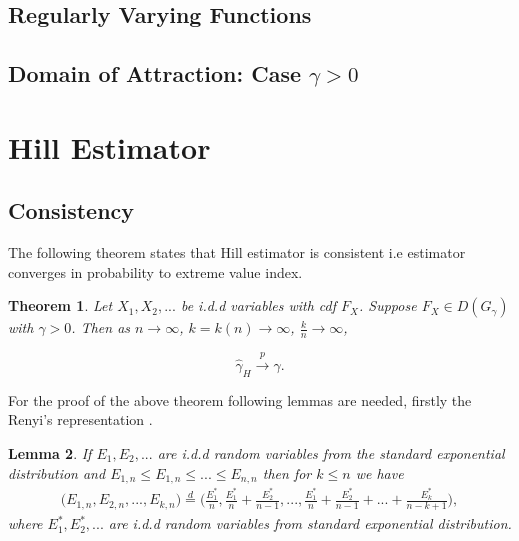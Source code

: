 \documentclass[english,12pt,a4paper,pdftex,sci,utf8]{aaltothesis} %
\newtheorem{theorem}{Theorem}[section]
\newtheorem{lemma}[theorem]{Lemma}
\begin{document}
\subsection{Regularly Varying Functions}

\subsection{Domain of Attraction: Case $\gamma>0$}

\clearpage

\section{Hill Estimator}

\subsection{Consistency}

The following theorem states that Hill estimator is consistent i.e estimator converges in probability to extreme value index. \cite{deHaan}


\begin{theorem}
Let $X_1, X_2,...$ be i.d.d variables with cdf $F_X$. Suppose $F_X \in D(G_{\gamma})$ with $\gamma > 0$. Then as $n \rightarrow \infty$, $k=k(n)  \rightarrow \infty$, $\frac{k}{n} \rightarrow \infty$,

\begin{equation*}
\hat{\gamma}_H \xrightarrow{p} \gamma.
\end{equation*}
\label{hillcons}
\end{theorem}

For the proof of the above theorem following lemmas are needed, firstly the Renyi's representation \cite{renyi}.
\begin{lemma}
If $E_1, E_2,...$ are i.d.d random variables from the standard exponential distribution and $E_{1,n} \leq E_{1,n} \leq ... \leq E_{n,n}$ then for $k \leq n$ we have
\begin{multline}
\big(E_{1,n}, E_{2,n}, ... , E_{k,n}\big) 
\overset{d}{=} \Big(\frac{E_1^*}{n}, \frac{E_1^*}{n}+\frac{E_2^*}{n-1}, ... , \frac{E_1^*}{n}+\frac{E_2^*}{n-1}+...+ \frac{E_k^*}{n-k+1}\Big),
\end{multline}
where $E_1^*,E_2^*,...$ are i.d.d random variables from standard exponential distribution.
\label{renrep}
\end{lemma}
\end{document}
